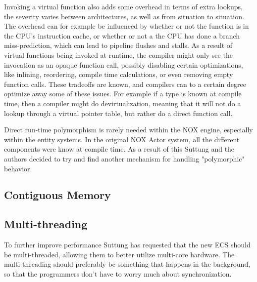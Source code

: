Invoking a virtual function also adds some overhead in terms of extra lookups, the severity varies between architectures,
as well as from situation to situation.
The overhead can for example be influenced by whether or not the function is in the CPU's instruction cache,
or whether or not a the CPU has done a branch miss-prediction, which can lead to pipeline flushes and stalls. \cite{scott_meyers_cpu_caches_and_why_you_care} \cite[Data Locality]{game_programming_patterns}
As a result of virtual functions being invoked at runtime, the compiler might only see the invocation as an opaque function call,
possibly disabling certain optimizations, like inlining, reordering, compile time calculations, or even removing empty function calls. 
These tradeoffs are known, and compilers can to a certain degree optimize away some of these issues.
For example if a type is known at compile time, then a compiler might do devirtualization,
meaning that it will not do a lookup through a virtual pointer table, but rather do a direct function call. \cite{lazarenko_devirtualization}

Direct run-time polymorphism is rarely needed within the NOX engine, especially within the entity systems.
In the original NOX Actor system, all the different components were know at compile time.
As a result of this Suttung and the authors decided to try and find another mechanism for handling "polymorphic" behavior.

\subsection{Contiguous Memory}
\label{subsec:requirements_performance_contiguous_memory}


\subsection{Multi-threading}
\label{subsec:requirements_performance_multi_threading}
To further improve performance Suttung has requested that the new ECS should be multi-threaded, allowing them to better utilize multi-core hardware.
The multi-threading should preferably be something that happens in the background, so that the programmers don't have to worry much about synchronization.
